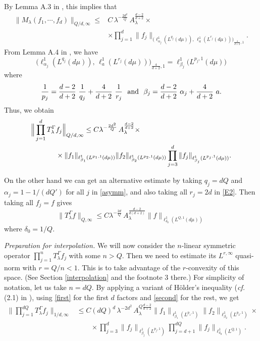 \documentclass[11 pt]{amsart}
\theoremstyle{plain}
\numberwithin{equation}{section}
\theoremstyle{plain}
\numberwithin{equation}{section}
\theoremstyle{remark}
\begin{document}
By Lemma A.3 in \cite{BOS3}, this implies that
\begin{align*}\label{}
\| M_{\lambda} (f_1, \cdots, f_d)\|_{Q/d,\infty} \le & C \, {\lambda}^{-\frac{2 d^2}{Q}}\,A_{\lambda}^{\frac{d-2}{d+2}} \times \\
&\times \prod_{j=1}^d \| f_j\|_{\big(\ell^1_{\alpha_j} (L^{q_j}(d\mu
)), \, \ell^1_a (L^{r_j}(d\mu )) \big)_{\frac{4}{d+2},1}}.
\end{align*}
From Lemma A.4 in \cite{BOS3}, we have
\[ \big( \ell^1_{\alpha_j} (L^{q_j}(d\mu )),
\, \ell^1_a (L^{r_j}(d\mu )) \big)_{\frac{4}{d+2},1} = \ell^1_{\beta_j}
\big( L^{p_j,1}(d\mu ) \big)
\]
where
\begin{equation*}\label{p1}
{1\over p_j} = {d-2 \over d+2}\ {1\over q_j} + {4\over d+2}\ {1\over r_j}~ \text{ and }~
\beta_j = {d-2 \over d+2}\ \alpha_j + {4\over d+2}\ a .
\end{equation*}
Thus, we obtain
\begin{align}\label{first}
\Big\| \prod_{j=1}^d T_{\lambda}^{\Gamma} & f_j \Big\|_{Q/d,\infty} \le
C  {\lambda}^{-\frac{2 d^2}{Q}} \, A_{\lambda}^{\frac{d-2}{d+2}} \times \\
& \times \| f_1\|_{\ell^1_{\beta_1} (L^{p_1,1}(d\mu ))}
\| f_2 \|_{\ell^1_{\beta_2} (L^{p_2,1}(d\mu ))}
\prod_{j=3}^d  \| f_j \|_{\ell^1_{\beta_j} (L^{p_j,1}(d\mu ))} . \notag
\end{align}

On the other hand we can get an alternative estimate by
taking $q_j = d Q$ and $\alpha_j = 1-1/(d Q')$ for all $j$ in
\eqref{asymm}, and also taking all $r_j=2d$ in \eqref{E2}. Then taking all $f_j = f$ gives
\begin{equation}\label{second}
\big\| T_{\lambda}^{\Gamma} f \big\|_{Q,\infty} \le
C {\lambda}^{-\frac{2 d}{Q}}\,A_{\lambda}^{\frac{d-2}{d(d+2)}} \| f
\|_{\ell^1_{\delta_0} (L^{Q,1} (d\mu ))}
\end{equation}
where $\delta_0 = 1/Q$.

\medskip

{\sl Preparation for interpolation.} We will now consider the $n$-linear symmetric operator $\prod_{j=1}^n T_{\lambda}^{\Gamma} f_j$ with some $n > Q$. Then we need to estimate its $L^{r,\infty}$ quasi-norm with $r=Q/n <1$. This is to take advantage of the $r$-convexity of this space. (See Section \ref{interpolation} and the footnote 3 there.) For simplicity of notation, let us take $n=dQ$.
By applying a variant of H\"older's inequality ({\it cf.} (2.1) in
\cite{BOS1}), using \eqref{first} for the first $d$ factors and \eqref{second} for the rest, we
get
\begin{align*}\label{}
\Big\| \prod_{j=1}^{dQ} T_{\lambda}^{\Gamma} f_j \Big\|_{1/d ,\infty}
& \le C (dQ)^d \, {\lambda}^{-2 d^2} \,A_{\lambda}^{Q\frac{d-2}{d+2}}
\| f_1 \|_{\ell^1_{\beta_1} (L^{p_1,1})} \| f_2 \|_{\ell^1_{\beta_2} (L^{p_2,1})}\times \\
&\qquad \times  \prod_{j=3}^d  \| f_j \|_{\ell^1_{\beta_j} (L^{p_j,1})} \prod_{j=d+1}^{dQ}
\| f_j \|_{\ell^1_{\delta_0} (L^{Q,1})} .
\end{align*}
\end{document}
